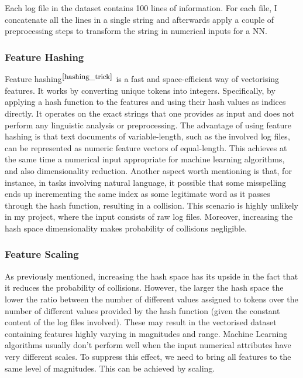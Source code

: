 Each log file in the dataset contains 100 lines of information. For each file, I concatenate all the lines in a single string and afterwards apply a couple of preprocessing steps to transform the string in numerical inputs for a NN. 

\subsubsection*{Feature Hashing}

Feature hashing$^{\small \cite{hashing_trick}}$ is a fast and space-efficient way of vectorising features. It works by converting unique tokens into integers. Specifically, by applying a hash function to the features and using their hash values as indices directly. It operates on the exact strings that one provides as input and does not perform any linguistic analysis or preprocessing. The advantage of using feature hashing is that text documents of variable-length, such as the involved log files, can be represented as numeric feature vectors of equal-length. This achieves at the same time a numerical input appropriate for machine learning algorithms, and also dimensionality reduction. Another aspect worth mentioning is that, for instance, in tasks involving natural language, it possible that some misspelling ends up incrementing the same index as some legitimate word as it passes through the hash function, resulting in a collision. This scenario is highly unlikely in my project, where the input consists of raw log files. Moreover, increasing the hash space dimensionality makes probability of collisions negligible.

\subsubsection*{Feature Scaling}

As previously mentioned, increasing the hash space has its upside in the fact that it reduces the probability of collisions. However, the larger the hash space the lower the ratio between the number of different values assigned to tokens over the number of different values provided by the hash function (given the constant content of the log files involved). These may result in the vectorised dataset containing features highly varying in magnitudes and range. Machine Learning algorithms usually don’t perform well when the input numerical attributes have very different scales. To suppress this effect, we need to bring all features to the same level of magnitudes. This can be achieved by scaling. \\

